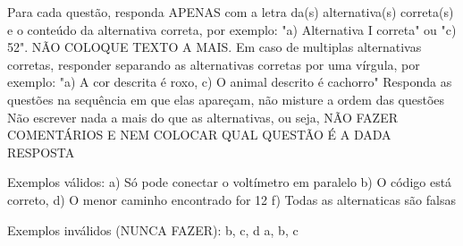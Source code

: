 Para cada questão, responda APENAS com a letra da(s) alternativa(s) correta(s) e o conteúdo da alternativa correta, por exemplo: "a) Alternativa I correta" ou "c) 52". NÃO COLOQUE TEXTO A MAIS.
Em caso de multiplas alternativas corretas, responder separando as alternativas corretas por uma vírgula, por exemplo: "a) A cor descrita é roxo, c) O animal descrito é cachorro"
Responda as questões na sequência em que elas apareçam, não misture a ordem das questões
Não escrever nada a mais do que as alternativas, ou seja, NÃO FAZER COMENTÁRIOS E NEM COLOCAR QUAL QUESTÃO É A DADA RESPOSTA

Exemplos válidos:
a) Só pode conectar o voltímetro em paralelo
b) O código está correto, d) O menor caminho encontrado for 12
f) Todas as alternaticas são falsas

Exemplos inválidos (NUNCA FAZER):
b, c, d
a, b, c